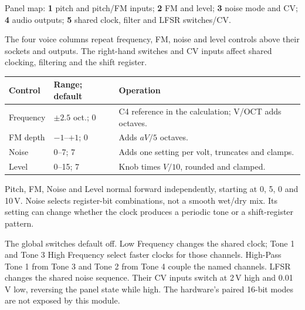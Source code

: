 Panel map: \textbf{1} pitch and pitch/FM inputs;
\textbf{2} FM and level;
\textbf{3} noise mode and CV;
\textbf{4} audio outputs;
\textbf{5} shared clock, filter and LFSR switches/CV.

The four voice columns repeat frequency, FM, noise and level controls above
their sockets and outputs. The right-hand switches and CV inputs affect shared
clocking, filtering and the shift register.

\begin{tabularx}{\textwidth}{@{}l l X@{}}
\toprule Control & Range; default & Operation \\\midrule
Frequency & $\pm2.5$ oct.; 0 & C4 reference in the calculation; V/OCT adds octaves. \\
FM depth & $-1$--$+1$; 0 & Adds $aV/5$ octaves. \\
Noise & 0--7; 7 & Adds one setting per volt, truncates and clamps. \\
Level & 0--15; 7 & Knob times $V/10$, rounded and clamped. \\
\bottomrule
\end{tabularx}

Pitch, FM, Noise and Level normal forward independently, starting at 0, 5,
0 and 10\,V. Noise selects register-bit combinations, not a smooth wet/dry
mix. Its setting can change whether the clock produces a periodic tone or
a shift-register pattern.

The global switches default off. Low Frequency changes the shared clock;
Tone 1 and Tone 3 High Frequency select faster clocks for those channels.
High-Pass Tone 1 from Tone 3 and Tone 2 from Tone 4 couple the named channels.
LFSR changes the shared noise sequence. Their CV inputs switch at 2\,V high
and 0.01\,V low, reversing the panel state while high. The hardware's paired
16-bit modes are not exposed by this module.

